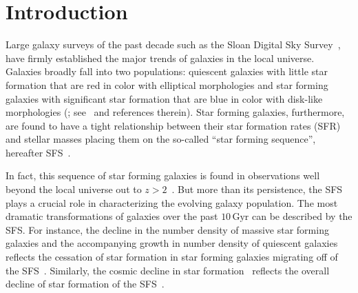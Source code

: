 \documentclass[tighten, preprint]{aastex62}
\newcommand{\todo}[1]{{\bf \textcolor{red}{ #1}}}
\begin{document}
\section{Introduction}
Large galaxy surveys of the past decade such as the Sloan Digital Sky 
Survey~\citep[SDSS;][]{york2000}, have firmly established the major 
trends of galaxies in the local universe. Galaxies %
broadly fall into two populations: quiescent galaxies with little star
formation that are red in color with elliptical morphologies and star 
forming galaxies with significant star formation that are blue in color 
with disk-like morphologies 
(\citealt{kauffmann2003, blanton2003, baldry2006, taylor2009, moustakas2013}; 
see~\citealt{blanton2009} and references therein). 
Star forming galaxies, furthermore, are found to have a tight relationship 
between their star formation rates (SFR) and stellar masses placing them
on the so-called ``star forming sequence'', hereafter 
SFS~\citep[Figure~\ref{fig:sfrmstar_sdss}; \emph{e.g.}][]{noeske2007, daddi2007, salim2007}.


In fact, this sequence of star forming galaxies is found in observations 
well beyond the local universe out to $z > 2$~\citep{wang2013, leja2015, schreiber2015}.
But more than its persistence, the SFS plays a crucial role in characterizing 
the evolving galaxy population. The most dramatic transformations of 
galaxies over the past $10\,\mathrm{Gyr}$ can be described by the SFS. 
For instance, the decline in the number density of massive 
star forming galaxies and the accompanying growth in number density of 
quiescent galaxies reflects the cessation of star formation in 
star forming galaxies migrating off of the 
SFS~\citep{blanton2006, borch2006, bundy2006, moustakas2013}. 
Similarly, the cosmic decline in star formation~\citep{hopkins2006,
behroozi2013a, madau2014} reflects the overall decline of star 
formation of the SFS~\citep{schreiber2015}. 
\end{document}
